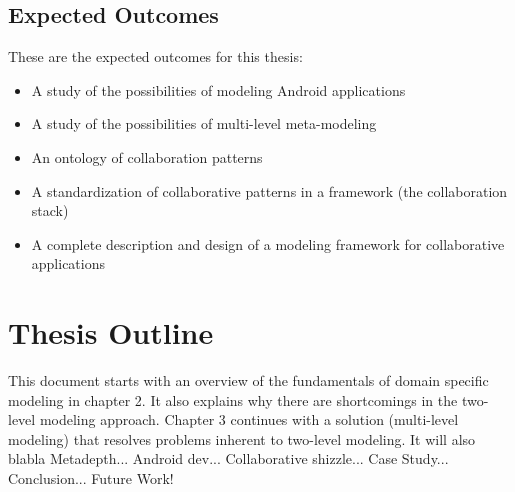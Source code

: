 \subsection{Expected Outcomes}

These are the expected outcomes for this thesis:

\begin{itemize}
\item{A study of the possibilities of modeling Android applications}
\item{A study of the possibilities of multi-level meta-modeling}
\item{An ontology of collaboration patterns}
\item{A standardization of collaborative patterns in a framework (the collaboration stack)}
\item{A complete description and design of a modeling framework for collaborative applications}
\end{itemize}

\section{Thesis Outline}

This document starts with an overview of the fundamentals of domain specific modeling in chapter 2. It also explains why there are shortcomings in the two-level modeling approach. Chapter 3 continues with a solution (multi-level modeling) that resolves problems inherent to two-level modeling. It will also blabla Metadepth... Android dev... Collaborative shizzle... Case Study... Conclusion... Future Work!

